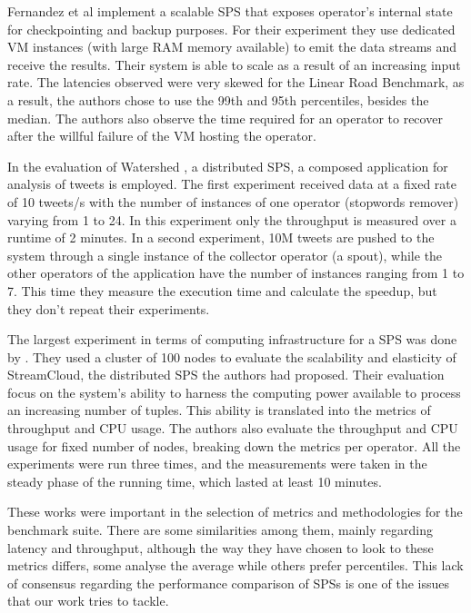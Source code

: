 \documentclass[ppgc,diss,english]{iiufrgs}
\begin{document}
Fernandez et al \cite{castro2013integrating} implement a scalable SPS that exposes operator's internal state for checkpointing and backup purposes. For their experiment they use dedicated VM instances (with large RAM memory available) to emit the data streams and receive the results. Their system is able to scale as a result of an increasing input rate. The latencies observed were very skewed for the Linear Road Benchmark, as a result, the authors chose to use the 99th and 95th percentiles, besides the median. The authors also observe the time required for an operator to recover after the willful failure of the VM hosting the operator.

In the evaluation of Watershed \cite{de2011watershed}, a distributed SPS, a composed application for analysis of tweets is employed. The first experiment received data at a fixed rate of 10 tweets/s with the number of instances of one operator (stopwords remover) varying from 1 to 24. In this experiment only the throughput is measured over a runtime of 2 minutes. In a second experiment, 10M tweets are pushed to the system through a single instance of the collector operator (a spout), while the other operators of the application have the number of instances ranging from 1 to 7. This time they measure the execution time and calculate the speedup, but they don't repeat their experiments.

The largest experiment in terms of computing infrastructure for a SPS was done by \cite{gulisano2012streamcloud}. They used a cluster of 100 nodes to evaluate the scalability and elasticity of StreamCloud, the distributed SPS the authors had proposed. Their evaluation focus on the system's ability to harness the computing power available to process an increasing number of tuples. This ability is translated into the metrics of throughput and CPU usage. The authors also evaluate the throughput and CPU usage for fixed number of nodes, breaking down the metrics per operator. All the experiments were run three times, and the measurements were taken in the steady phase of the running time, which lasted at least 10 minutes.

These works were important in the selection of metrics and methodologies for the benchmark suite. There are some similarities among them, mainly regarding latency and throughput, although the way they have chosen to look to these metrics differs, some analyse the average while others prefer percentiles. This lack of consensus regarding the performance comparison of SPSs is one of the issues that our work tries to tackle.
\end{document}
